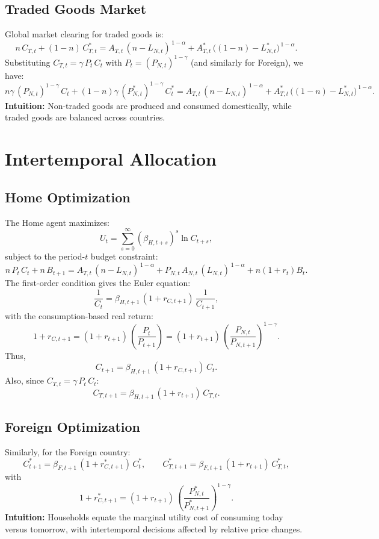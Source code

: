 \documentclass[a4paper,12pt]{article} %
\theoremstyle{nonitalic}
\begin{document}
\subsection*{Traded Goods Market}
Global market clearing for traded goods is:
\[
n\,C_{T,t} + (1-n)\,C^*_{T,t} = A_{T,t}\,(n-L_{N,t})^{\,1-\alpha} + A^*_{T,t}\,\big((1-n)-L^*_{N,t}\big)^{\,1-\alpha}.
\]
Substituting \( C_{T,t}=\gamma\,P_t\,C_t \) with \( P_t=(P_{N,t})^{1-\gamma} \) (and similarly for Foreign), we have:
\[
\boxed{n\gamma\,(P_{N,t})^{1-\gamma}\,C_t + (1-n)\gamma\,(P^*_{N,t})^{1-\gamma}\,C^*_t = A_{T,t}\,(n-L_{N,t})^{\,1-\alpha} + A^*_{T,t}\,\big((1-n)-L^*_{N,t}\big)^{\,1-\alpha}.}
\]
\textbf{Intuition:} Non-traded goods are produced and consumed domestically, while traded goods are balanced across countries.

\section{Intertemporal Allocation}

\subsection*{Home Optimization}
The Home agent maximizes:
\[
U_t = \sum_{s=0}^{\infty} (\beta_{H,t+s})^s \ln C_{t+s},
\]
subject to the period-\( t \) budget constraint:
\[
n\,P_t\,C_t + n\,B_{t+1} = A_{T,t}\,(n-L_{N,t})^{\,1-\alpha} + P_{N,t}\,A_{N,t}\,(L_{N,t})^{\,1-\alpha} + n(1+r_t)B_t.
\]
The first-order condition gives the Euler equation:
\[
\frac{1}{C_t} = \beta_{H,t+1}\,(1+r_{C,t+1})\,\frac{1}{C_{t+1}},
\]
with the consumption-based real return:
\[
1+r_{C,t+1} = (1+r_{t+1})\,\left(\frac{P_t}{P_{t+1}}\right) = (1+r_{t+1})\,\left(\frac{P_{N,t}}{P_{N,t+1}}\right)^{1-\gamma}.
\]
Thus,
\[
\boxed{C_{t+1} = \beta_{H,t+1}\,(1+r_{C,t+1})\,C_t.}
\]
Also, since \( C_{T,t}=\gamma\,P_t\,C_t \):
\[
\boxed{C_{T,t+1} = \beta_{H,t+1}\,(1+r_{t+1})\,C_{T,t}.}
\]

\subsection*{Foreign Optimization}
Similarly, for the Foreign country:
\[
\boxed{C^*_{t+1} = \beta_{F,t+1}\,(1+r^*_{C,t+1})\,C^*_t, \qquad C^*_{T,t+1} = \beta_{F,t+1}\,(1+r_{t+1})\,C^*_{T,t},}
\]
with
\[
1+r^*_{C,t+1} = (1+r_{t+1})\,\left(\frac{P^*_{N,t}}{P^*_{N,t+1}}\right)^{1-\gamma}.
\]
\textbf{Intuition:} Households equate the marginal utility cost of consuming today versus tomorrow, with intertemporal decisions affected by relative price changes.
\end{document}
